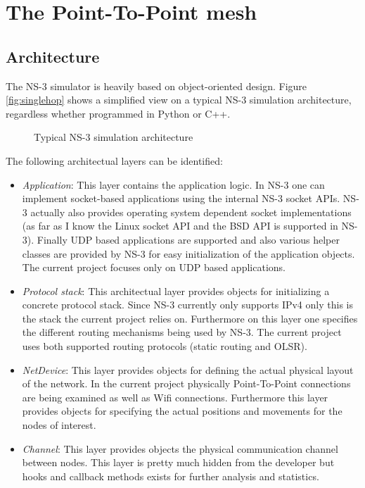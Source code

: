 
\section{The Point-To-Point mesh}


\subsection{\label{sub:Architecture}Architecture}

The NS-3 simulator is heavily based on object-oriented design. Figure
\ref{fig:singlehop} shows a simplified view on a typical NS-3 simulation
architecture, regardless whether programmed in Python or C++.

%
\begin{figure}
\begin{centering}

\par\end{centering}

\caption{Typical NS-3 simulation architecture}



\end{figure}


The following architectual layers can be identified:
\begin{itemize}
\item \textit{Application}: This layer contains the application logic. In
NS-3 one can implement socket-based applications using the internal
NS-3 socket APIs. NS-3 actually also provides operating system dependent
socket implementations (as far as I know the Linux socket API and
the BSD API is supported in NS-3). Finally UDP based applications
are supported and also various helper classes are provided by NS-3
for easy initialization of the application objects. The current project
focuses only on UDP based applications.
\item \textit{Protocol stack}: This architectual layer provides objects
for initializing a concrete protocol stack. Since NS-3 currently only
supports IPv4 only this is the stack the current project relies on.
Furthermore on this layer one specifies the different routing mechanisms
being used by NS-3. The current project uses both supported routing
protocols (static routing and OLSR).
\item \textit{NetDevice}: This layer provides objects for defining the actual
physical layout of the network. In the current project physically
Point-To-Point connections are being examined as well as Wifi connections.
Furthermore this layer provides objects for specifying the actual
positions and movements for the nodes of interest.
\item \textit{Channel}: This layer provides objects the physical communication
channel between nodes. This layer is pretty much hidden from the developer
but hooks and callback methods exists for further analysis and statistics.
\end{itemize}


